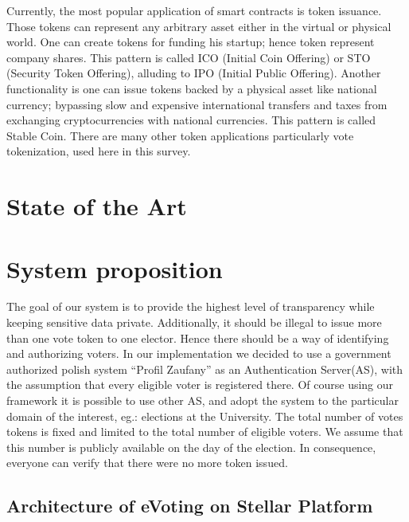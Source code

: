\documentclass[runningheads]{llncs}
\begin{document}
Currently, the most popular application of smart contracts is token issuance. Those tokens can represent any arbitrary asset either in the virtual or physical world. One can create tokens for funding his startup; hence token represent company shares. This pattern is called ICO (Initial Coin Offering) or STO (Security Token Offering), alluding to IPO (Initial Public Offering). 
Another functionality is one can issue tokens backed by a physical asset like national currency; bypassing slow and expensive international transfers and taxes from exchanging cryptocurrencies with national currencies. This pattern is called Stable Coin. There are many other token applications particularly vote tokenization, used here in this survey.

\section{State of the Art}

\section{System proposition}
The goal of our system is to provide the highest level of transparency while keeping sensitive data private. Additionally, it should be illegal to issue more than one vote token to one elector. Hence there should be a way of identifying and authorizing voters. 
In our implementation we decided to use a government authorized polish system
“Profil Zaufany” as an Authentication Server(AS), with the assumption that every eligible voter is registered there. 
Of course using our framework it is possible to use other AS,
and adopt the system to the 
particular domain of the interest, 
eg.: elections at the University.
The total number of votes tokens is fixed and limited to the total number of eligible voters. We assume that this number is publicly available on the day of the election. In consequence, everyone can verify that there were no more token issued. 

\subsection{Architecture of eVoting on Stellar Platform}
\end{document}
